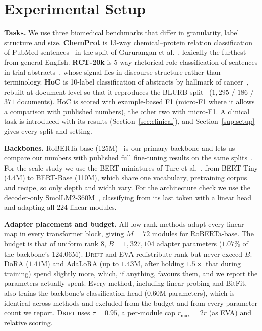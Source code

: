 \documentclass[conference]{IEEEtran}
\newcommand{\method}{\textsc{Drift}}
\begin{document}
\section{Experimental Setup}
\label{sec:setup}

\noindent\textbf{Tasks.}
We use three biomedical benchmarks that differ in granularity, label structure
and size. \textbf{ChemProt} is 13-way chemical--protein relation classification
of PubMed sentences~\cite{krallinger2017chemprot} in the split of Gururangan et
al.~\cite{gururangan2020dapt}, lexically the furthest from general English.
\textbf{RCT-20k} is 5-way rhetorical-role classification of sentences in trial
abstracts~\cite{dernoncourt2017rct}, whose signal lies in discourse structure
rather than terminology. \textbf{HoC} is 10-label classification of abstracts by
hallmark of cancer~\cite{baker2016hoc}, rebuilt at document level so that it
reproduces the BLURB split~\cite{gu2021pubmedbert} ($1{,}295$ / $186$ / $371$
documents). HoC is scored with example-based F1 (micro-F1 where it allows a
comparison with published numbers), the other two with micro-F1. A clinical task
is introduced with its results (Section~\ref{sec:clinical}), and
Section~\ref{sup:setup} gives every split and setting.

\noindent\textbf{Backbones.}
RoBERTa-base (125M)~\cite{liu2019roberta} is our primary backbone and lets us
compare our numbers with published full fine-tuning results on the same
splits~\cite{gururangan2020dapt}. For the scale study we use the BERT miniatures
of Turc et al.~\cite{turc2019wellread}, from BERT-Tiny (4.4M) to BERT-Base
(110M), which share one vocabulary, pretraining corpus and recipe, so only depth
and width vary. For the architecture check we use the decoder-only
SmolLM2-360M~\cite{benallal2025smollm2}, classifying from its last token with a
linear head and adapting all $224$ linear modules.

\noindent\textbf{Adapter placement and budget.}
All low-rank methods adapt every linear map in every transformer block, giving
$M = 72$ modules for RoBERTa-base. The budget is that of uniform rank $8$,
$B = 1{,}327{,}104$ adapter parameters ($1.07\%$ of the backbone's $124.06$M).
\method{} and EVA redistribute rank but never exceed $B$. DoRA ($1.41$M) and
AdaLoRA (up to $1.43$M, after holding $1.5\times$ that during training) spend
slightly more, which, if anything, favours them, and we report the parameters
actually spent. Every method, including linear probing and BitFit, also trains
the backbone's classification head ($0.60$M parameters), which is identical
across methods and excluded from the budget and from every parameter count we
report. \method{} uses $\tau = 0.95$, a per-module cap $r_{\max} = 2r$ (as EVA)
and relative scoring.
\end{document}
